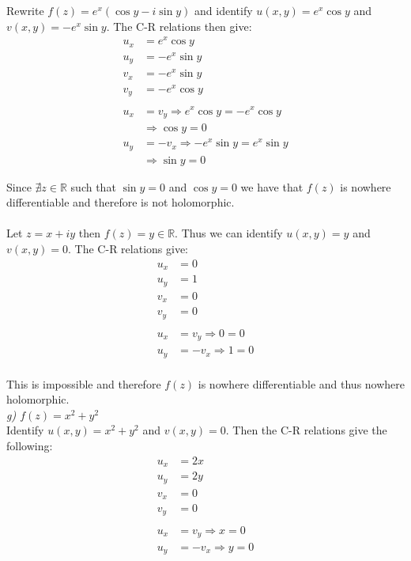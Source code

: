 \documentclass[a4paper, 11pt]{article}
\begin{document}
	\noindent Rewrite $f(z) = e^{x}(\cos y - i\sin y)$ and identify $u(x,y) = e^{x}\cos y$ and $v(x,y)=-e^{x}\sin y$. The C-R relations then give: 
		\begin{align*}
			u_x &= e^{x}\cos y \\ 
			u_y &= -e^{x}\sin y \\ 
			v_x &= -e^{x}\sin y \\ 
			v_y &= -e^{x}\cos y \\ 
			&\quad \\ 
			u_x &= v_y \Rightarrow e^{x}\cos y = -e^{x}\cos y \\ 
				&\Rightarrow \cos y = 0 \\ 
			u_y &= -v_x \Rightarrow -e^{x}\sin y = e^{x}\sin y \\ 
				&\Rightarrow \sin y = 0 
		\end{align*}
		
	\noindent Since $\nexists z \in \mathbb{R}$ such that $\sin y=0$ and $\cos y=0$ we have that $f(z)$ is nowhere differentiable and therefore is not holomorphic.  \\
	
	\noindent{}\\
	
	\noindent Let $z = x + iy$ then $f(z) = y \in \mathbb{R}$. Thus we can identify $u(x,y) = y$ and $v(x,y)=0$. The C-R relations give: 
		\begin{align*}
			u_x &= 0 \\
			u_y &= 1 \\
			v_x &= 0 \\ 
			v_y &= 0 \\ 
			&\quad \\ 
			u_x &= v_y \Rightarrow 0 = 0 \\ 
			u_y &=-v_x \Rightarrow 1 = 0 \\  
		\end{align*}
	
	\noindent This is impossible and therefore $f(z)$ is nowhere differentiable and thus nowhere holomorphic. \\
	
	\noindent\textit{g) $f(z) = x^2 + y^2$} \\ 
	
	\noindent Identify $u(x,y)=x^2+y^2$ and $v(x,y)=0$. Then the C-R relations give the following: 
		\begin{align*}
			u_x &= 2x \\ 
			u_y &= 2y \\ 
			v_x &= 0 \\ 
			v_y &= 0 \\ 
			&\quad \\ 
			u_x &= v_y \Rightarrow x = 0 \\ 
			u_y &= -v_x \Rightarrow y = 0 \\ 
		\end{align*}
		
\end{document}
